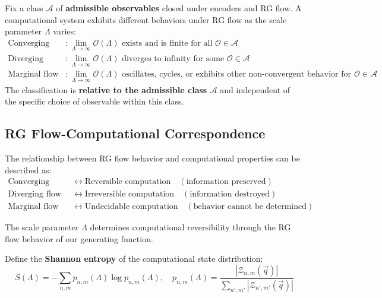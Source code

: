 \begin{definition}
\label{def:rg-flow-classification}
Fix a class $\mathcal{A}$ of \textbf{admissible observables} closed under encoders and RG flow. A computational system exhibits different behaviors under RG flow as the scale parameter $\Lambda$ varies:
\begin{align}
\text{Converging flow} &: \lim_{\Lambda \to \infty} \mathcal{O}(\Lambda) \text{ exists and is finite for all } \mathcal{O} \in \mathcal{A} \\
\text{Diverging flow} &: \lim_{\Lambda \to \infty} \mathcal{O}(\Lambda) \text{ diverges to infinity for some } \mathcal{O} \in \mathcal{A} \\
\text{Marginal flow} &: \lim_{\Lambda \to \infty} \mathcal{O}(\Lambda) \text{ oscillates, cycles, or exhibits other non-convergent behavior for some } \mathcal{O} \in \mathcal{A}
\end{align}
The classification is \textbf{relative to the admissible class $\mathcal{A}$} and independent of the specific choice of observable within this class.
\end{definition}

\subsection{RG Flow-Computational Correspondence}

\begin{theorem}
\label{thm:rg-computational-correspondence}
The relationship between RG flow behavior and computational properties can be described as:
\begin{align}
\text{Converging flow} &\leftrightarrow \text{Reversible computation} \quad (\text{information preserved}) \\
\text{Diverging flow} &\leftrightarrow \text{Irreversible computation} \quad (\text{information destroyed}) \\
\text{Marginal flow} &\leftrightarrow \text{Undecidable computation} \quad (\text{behavior cannot be determined})
\end{align}
\end{theorem}

The scale parameter $\Lambda$ determines computational reversibility through the RG flow behavior of our generating function. 

\begin{definition}
\label{def:information-monotone}
Define the \textbf{Shannon entropy} of the computational state distribution:
\[
S(\Lambda) = -\sum_{n,m} p_{n,m}(\Lambda) \log p_{n,m}(\Lambda), \quad p_{n,m}(\Lambda) = \frac{|\mathcal{Z}_{n,m}(\vec{q})|}{\sum_{n',m'} |\mathcal{Z}_{n',m'}(\vec{q})|}
\]
\end{definition}

